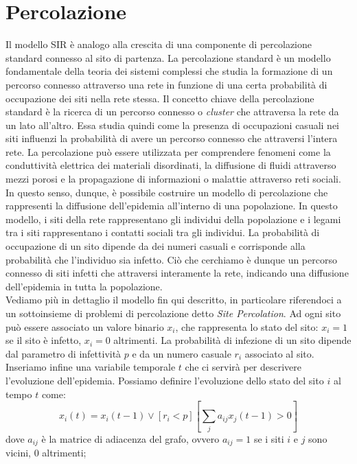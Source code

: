 \documentclass{article}
\begin{document}
    \section{Percolazione}
    Il modello SIR è analogo alla crescita di una componente di percolazione standard connesso al sito di partenza.
    La percolazione standard è un modello fondamentale della teoria dei sistemi complessi che studia la formazione di un
    percorso connesso attraverso una rete in funzione di una certa probabilità di occupazione dei siti nella rete stessa.
    Il concetto chiave della percolazione standard è la ricerca di un percorso connesso o \textit{cluster} che attraversa
    la rete da un lato all'altro. Essa studia quindi come la presenza di occupazioni casuali nei siti influenzi la
    probabilità di avere un percorso connesso che attraversi l'intera rete.
    La percolazione può essere utilizzata per comprendere fenomeni come la conduttività elettrica dei materiali disordinati,
    la diffusione di fluidi attraverso mezzi porosi e la propagazione di informazioni o malattie attraverso reti sociali.\\
    In questo senso, dunque, è possibile costruire un modello di percolazione che rappresenti la diffusione dell'epidemia
    all'interno di una popolazione. In questo modello, i siti della rete rappresentano gli individui della popolazione e
    i legami tra i siti rappresentano i contatti sociali tra gli individui. La probabilità di occupazione di un sito
    dipende da dei numeri casuali e corrisponde alla probabilità che l'individuo sia infetto. Ciò che cerchiamo è dunque
    un percorso connesso di siti infetti che attraversi interamente la rete, indicando una diffusione dell'epidemia in
    tutta la popolazione.\\
    Vediamo più in dettaglio il modello fin qui descritto, in particolare riferendoci a un sottoinsieme di problemi di
    percolazione detto \textit{Site Percolation}. Ad ogni sito può essere associato un valore binario $x_i$, che
    rappresenta lo stato del sito: $x_i=1$ se il sito è infetto, $x_i=0$ altrimenti. La probabilità di infezione di un
    sito dipende dal parametro di infettività $p$ e da un numero casuale $r_i$ associato al sito. Inseriamo infine una
    variabile temporale $t$ che ci servirà per descrivere l'evoluzione dell'epidemia. Possiamo definire l'evoluzione dello
    stato del sito $i$ al tempo $t$ come:
    \[x_i(t)=x_i(t-1)\lor[r_i < p]\left[\sum_{j} a_{ij}x_j(t-1)>0 \right]\]
    dove $a_{ij}$ è la matrice di adiacenza del grafo, ovvero $a_{ij}=1$ se i siti $i$ e $j$ sono vicini, $0$ altrimenti;
\end{document}
